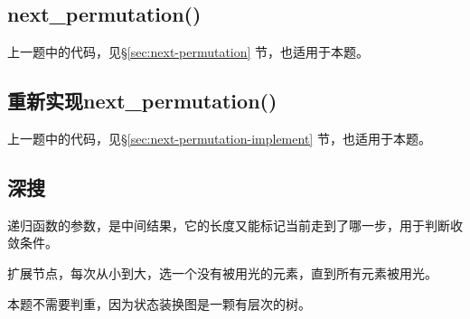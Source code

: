 \subsection{next_permutation()}
上一题中的代码，见\S \ref{sec:next-permutation} 节，也适用于本题。


\subsection{重新实现next_permutation()}
上一题中的代码，见\S \ref{sec:next-permutation-implement} 节，也适用于本题。


\subsection{深搜}
递归函数的参数，是中间结果，它的长度又能标记当前走到了哪一步，用于判断收敛条件。

扩展节点，每次从小到大，选一个没有被用光的元素，直到所有元素被用光。

本题不需要判重，因为状态装换图是一颗有层次的树。


